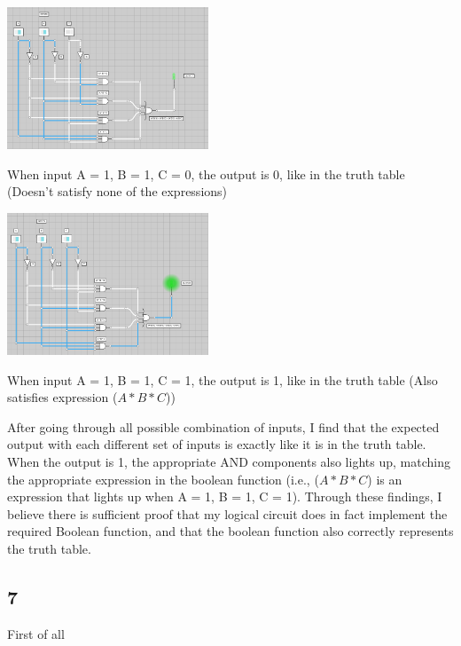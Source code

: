 \documentclass{article}
\begin{document}
    \includegraphics*[width=0.45\textwidth]{circuit7.png}

    \small When input A = 1, B = 1, C = 0, the output is 0, like in the truth table (Doesn't satisfy none of the expressions)

    \vspace*{0.1in}

    \includegraphics*[width=0.45\textwidth]{circuit8.png}

    \small When input A = 1, B = 1, C = 1, the output is 1, like in the truth table (Also satisfies expression ($A*B*C$))

    \vspace*{0.2in}

    After going through all possible combination of inputs, I find that the expected output with each different set of inputs is exactly like it is in the truth table. When the output is 1, the appropriate AND components also lights up, matching the appropriate expression in the boolean function (i.e., ($A*B*C$) is an expression that lights up when A = 1, B = 1, C = 1). Through these findings, I believe there is sufficient proof that my logical circuit does in fact implement the required Boolean function, and that the boolean function also correctly represents the truth table.

    \subsection*{7}

    First of all

    \vspace*{0.1in}
\end{document}
